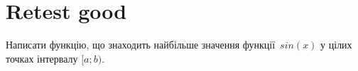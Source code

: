 \documentclass[12pt]{article}
\begin{document}
\section*{Retest good}

Написати функцію, що знаходить найбільше значення функції~$sin(x)$ у цілих точках інтервалу $[a; b)$.


\end{document}
